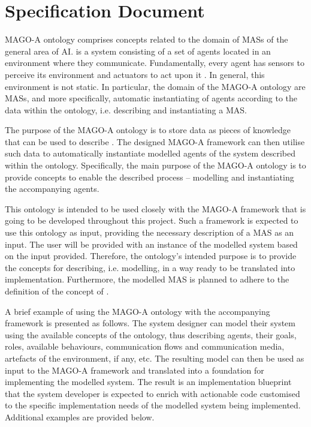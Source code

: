 \section{Specification Document}

MAGO-A ontology
%
comprises concepts related to the domain of \acp{MAS} of the general area of \ac{AI}.  is a system consisting of a set of agents located in an environment where they communicate. Fundamentally, every agent has sensors to perceive its environment and actuators to act upon it \cite[p. 54]{russell2022ArtificialIntelligenceModern}. In general, this environment is not static. In particular, the domain of the MAGO-A ontology are \acp{MAS}, and more specifically, automatic instantiating of agents according to the data within the ontology, i.e. describing and instantiating a \ac{MAS}.

The purpose
%
of the MAGO-A ontology is to store data as pieces of knowledge that can be used to describe . The designed MAGO-A framework can then utilise such data to automatically instantiate modelled agents of the system described within the ontology. Specifically, the main purpose of the MAGO-A ontology is to provide concepts to enable the described process -- modelling  and instantiating the accompanying agents.

This ontology is intended to be used
%
closely with the MAGO-A framework that is going to be developed throughout this project. Such a framework is expected to use this ontology as input, providing the necessary description of a \ac{MAS} as an input. The user will be provided with an instance of the modelled system based on the input provided. Therefore, the ontology's intended purpose is to provide the concepts for describing, i.e. modelling,  in a way ready to be translated into implementation. Furthermore, the modelled \ac{MAS} is planned to adhere to the definition of the concept of .

A brief example of using
%
the MAGO-A ontology with the accompanying framework is presented as follows. The system designer can model their system using the available concepts of the ontology, thus describing agents, their goals, roles, available behaviours, communication flows and communication media, artefacts of the environment, if any, etc. The resulting model can then be used as input to the MAGO-A framework and translated into a foundation for implementing the modelled system. The result is an implementation blueprint that the system developer is expected to enrich with actionable code customised to the specific implementation needs of the modelled system being implemented. Additional examples are provided below.%

